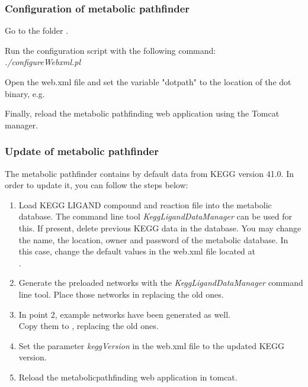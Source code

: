 \documentclass{book}
\begin{document}
\subsubsection{Configuration of metabolic pathfinder}
Go to the folder
.

Run the configuration script with the following command:\\
\textit{./configureWebxml.pl}

Open the web.xml file and set the variable "dotpath" to the location
of the dot binary, e.g. 

Finally, reload the metabolic pathfinding web application using the Tomcat manager.

\subsubsection{Update of metabolic pathfinder}
The metabolic pathfinder contains by default data from KEGG version 41.0.
In order to update it, you can follow the steps below:

\begin{enumerate}

\item Load KEGG LIGAND compound and reaction file into the metabolic database.
      The command line tool \textit{KeggLigandDataManager} can be used for this.
      If present, delete previous KEGG data in the database. You may change the name,
      the location, owner and password of the metabolic database. In this case, change the
      default values in the web.xml file located at\\
      .

\item Generate the preloaded networks with the \textit{KeggLigandDataManager} command line tool.
      Place those networks in  replacing the old ones.

\item In point 2, example networks have been generated as well.\\
      Copy them to
      , replacing the old ones.

\item Set the parameter \textit{keggVersion} in the web.xml file to the updated KEGG version.

\item Reload the metabolicpathfinding web application in tomcat.

\end{enumerate}
\end{document}
